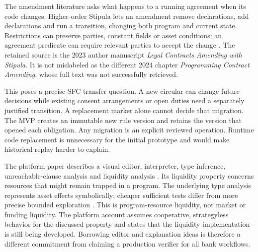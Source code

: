 The amendment literature asks what happens to a running agreement when its code
changes. Higher-order Stipula lets an amendment remove declarations, add
declarations and run a transition, changing both program and current state.
Restrictions can preserve parties, constant fields or asset conditions; an
agreement predicate can require relevant parties to accept the change
\citep[secs.~4--6]{amending2023}. The retained source is the 2023 author manuscript
\emph{Legal Contracts Amending with Stipula}. It is not mislabeled as the different
2024 chapter \emph{Programming Contract Amending}, whose full text was not
successfully retrieved.

This poses a precise SFC transfer question. A new circular can change future
decisions while existing consent arrangements or open duties need a separately
justified transition. A replacement marker alone cannot decide that migration.
The MVP creates an immutable new rule version and retains the version that
opened each obligation. Any migration is an explicit reviewed operation.
Runtime code replacement is unnecessary for the initial prototype and would make
historical replay harder to explain.

The platform paper describes a visual editor, interpreter, type inference,
unreachable-clause analysis and liquidity analysis
\citep[secs.~3--7]{stipulaplatform2026}. Its liquidity property concerns resources
that might remain trapped in a program. The underlying type analysis represents
asset effects symbolically; cheaper sufficient tests differ from more precise
bounded exploration \citep[secs.~4--5 and proof appendices]{liquidity2023}.
This is program-resource liquidity, not market or funding liquidity. The platform
account assumes cooperative, strategyless behavior for the discussed property
and states that the liquidity implementation is still being developed. Borrowing
editor and explanation ideas is therefore a different commitment from claiming
a production verifier for all bank workflows.
